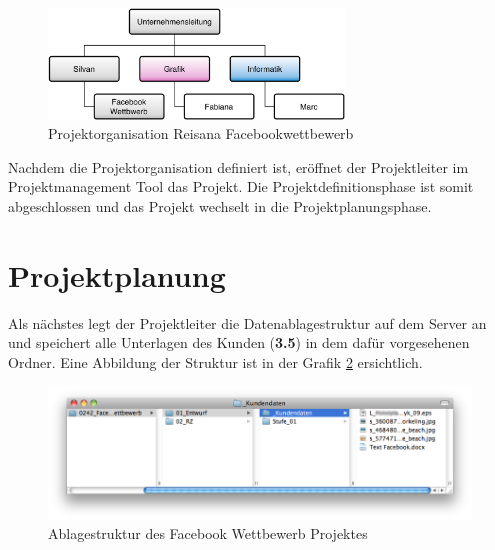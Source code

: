 \begin{figure}[htbp]
\begin{center}
\includegraphics[width=0.7\textwidth,angle=0]{./bilder/proof_of_concept/projektorganisation_poc.pdf}
\caption[Projektorganisation Reisana Facebookwettbewerb]{Projektorganisation 
    Reisana Facebookwettbewerb\footnotemark}
\label{pic:projektorganisation_poc}
\end{center}
\end{figure}

Nachdem die Projektorganisation definiert ist, eröffnet der Projektleiter
im Projektmanagement Tool das Projekt. Die Projektdefinitionsphase ist somit 
abgeschlossen und das Projekt wechselt in die Projektplanungsphase.

\section{Projektplanung}
Als nächstes legt der Projektleiter die Datenablagestruktur auf dem Server an
und speichert alle Unterlagen des Kunden (\textbf{3.5}) in dem dafür vorgesehenen Ordner.
Eine Abbildung der Struktur ist in der Grafik \ref{pic:ablagestruktur_poc} ersichtlich.

\begin{figure}[htbp]
\begin{center}
\includegraphics[width=1.0\textwidth,angle=0]{./bilder/proof_of_concept/ablagestruktur_poc.png}
\caption[Ablagestruktur des Facebook Wettbewerb Projektes]{Ablagestruktur des 
    Facebook Wettbewerb Projektes\footnotemark}
\label{pic:ablagestruktur_poc}
\end{center}
\end{figure}

